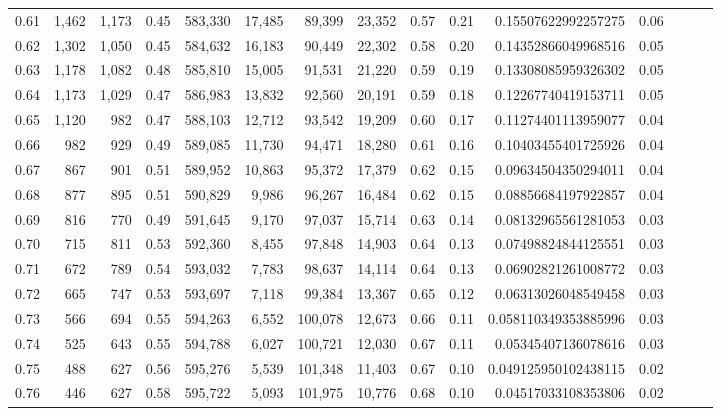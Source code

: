 \begin{tabular}{rrrrrrrrrrrrrrr}
0.61 &   1,462 &  1,173 &  0.45 &  583,330 &   17,485 &   89,399 &   23,352 &  0.57 &  0.21 &    0.15507622992257275 &      0.06 \\
0.62 &   1,302 &  1,050 &  0.45 &  584,632 &   16,183 &   90,449 &   22,302 &  0.58 &  0.20 &    0.14352866049968516 &      0.05 \\
0.63 &   1,178 &  1,082 &  0.48 &  585,810 &   15,005 &   91,531 &   21,220 &  0.59 &  0.19 &    0.13308085959326302 &      0.05 \\
0.64 &   1,173 &  1,029 &  0.47 &  586,983 &   13,832 &   92,560 &   20,191 &  0.59 &  0.18 &    0.12267740419153711 &      0.05 \\
0.65 &   1,120 &    982 &  0.47 &  588,103 &   12,712 &   93,542 &   19,209 &  0.60 &  0.17 &    0.11274401113959077 &      0.04 \\
0.66 &     982 &    929 &  0.49 &  589,085 &   11,730 &   94,471 &   18,280 &  0.61 &  0.16 &    0.10403455401725926 &      0.04 \\
0.67 &     867 &    901 &  0.51 &  589,952 &   10,863 &   95,372 &   17,379 &  0.62 &  0.15 &    0.09634504350294011 &      0.04 \\
0.68 &     877 &    895 &  0.51 &  590,829 &    9,986 &   96,267 &   16,484 &  0.62 &  0.15 &    0.08856684197922857 &      0.04 \\
0.69 &     816 &    770 &  0.49 &  591,645 &    9,170 &   97,037 &   15,714 &  0.63 &  0.14 &    0.08132965561281053 &      0.03 \\
0.70 &     715 &    811 &  0.53 &  592,360 &    8,455 &   97,848 &   14,903 &  0.64 &  0.13 &    0.07498824844125551 &      0.03 \\
0.71 &     672 &    789 &  0.54 &  593,032 &    7,783 &   98,637 &   14,114 &  0.64 &  0.13 &    0.06902821261008772 &      0.03 \\
0.72 &     665 &    747 &  0.53 &  593,697 &    7,118 &   99,384 &   13,367 &  0.65 &  0.12 &    0.06313026048549458 &      0.03 \\
0.73 &     566 &    694 &  0.55 &  594,263 &    6,552 &  100,078 &   12,673 &  0.66 &  0.11 &   0.058110349353885996 &      0.03 \\
0.74 &     525 &    643 &  0.55 &  594,788 &    6,027 &  100,721 &   12,030 &  0.67 &  0.11 &    0.05345407136078616 &      0.03 \\
0.75 &     488 &    627 &  0.56 &  595,276 &    5,539 &  101,348 &   11,403 &  0.67 &  0.10 &   0.049125950102438115 &      0.02 \\
0.76 &     446 &    627 &  0.58 &  595,722 &    5,093 &  101,975 &   10,776 &  0.68 &  0.10 &    0.04517033108353806 &      0.02 \\

\end{tabular}
